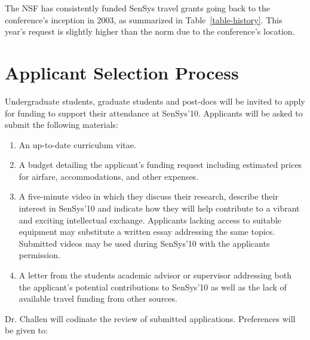 \documentclass[11pt,letterpaper]{article}
\begin{document}
The NSF has consistently funded SenSys travel grants going back to the
conference's inception in 2003, as summarized in Table~\ref{table-history}.
This year's request is slightly higher than the norm due to the conference's
location.

\section*{Applicant Selection Process}

Undergraduate students, graduate students and post-docs will be invited to
apply for funding to support their attendance at SenSys'10.
Applicants will be asked to submit the following materials:

\begin{enumerate}

\item An up-to-date curriculum vitae.

\item A budget detailing the applicant's funding request including estimated
prices for airfare, accommodations, and other expenses.

\item A five-minute video in which they discuss their research, describe
their interest in SenSys'10 and indicate how they will help contribute to a
vibrant and exciting intellectual exchange. Applicants lacking access to
suitable equipment may substitute a written essay addressing the same topics.
Submitted videos may be used during SenSys'10 with the applicants permission.

\item A letter from the students academic advisor or supervisor addressing
both the applicant's potential contributions to SenSys'10 as well as the lack
of available travel funding from other sources.

\end{enumerate}

Dr. Challen will codinate the review of submitted applications.
Preferences will be given to:
\end{document}
